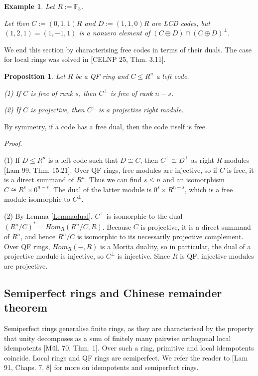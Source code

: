 \documentclass{article}
\theoremstyle{plain}
\newtheorem{Prop}[veta]{Proposition}
\newtheorem{Ex}[veta]{Example}
\theoremstyle{plain}
\theoremstyle{remark}
\theoremstyle{plain}
\newcommand{\F}{\mathbb{F}}
\newenvironment{dukaz}{
  \par\medskip \noindent
  \textit{Proof}.
}{

\rightline{$\qedsymbol$}
}
\begin{document}
\begin{Ex}\label{ExDirSum}
Let $R:=\F_3$.

Let then $C:=(0,1,1)R$ and $D:=(1,1,0)R$ are LCD codes, but $(1,2,1)=(1,-1,1)$ is a nonzero element of $(C\oplus D)\cap (C\oplus D)^\perp$.    
\end{Ex}


We end this section by characterising free codes in terms of their duals. The case for local rings was solved in [CELNP 25, Thm. 3.11].
\begin{Prop} \label{PropFree} Let $R$ be a QF ring and $C\leq R^n$ a left code.

(1) If $C$ is free of rank $s$, then $C^\perp$ is free of rank $n-s$.  

(2) If $C$ is projective, then $C^\perp$ is a projective right module.
\end{Prop}
By symmetry, if a code has a free dual, then the code itself is free.
\begin{dukaz}
(1) If $D\leq R^n$ is a left code such that $D\cong C$, then $C^\perp\cong D^\perp$ as right $R$-modules [Lam 99, Thm. 15.21].  Over QF rings, free modules are injective, so if $C$ is free, it is a direct summand of $R^n$. Thus we can find $s\leq n$ and an isomorphism $C\cong R^s\times 0^{n-s}$. The dual of the latter module is $0^s\times R^{n-s}$, which is a free module isomorphic to $C^\perp$. 

(2) By Lemma \ref{Lemmadual}, $C^\perp$ is isomorphic to the dual $(R^n/C)^*=Hom_R(R^n/C, R)$. Because $C$ is projective, it is a direct summand of $R^n$, and hence $R^n/C$ is isomorphic to its necessarily projective complement. Over QF rings, $Hom_R(-, R)$ is a Morita duality, so in particular, the dual of a projective module is injective, so $C^\perp$ is injective. Since $R$ is QF, injective modules are projective. 
\end{dukaz}

\subsection{Semiperfect rings and Chinese remainder theorem}\label{SecSemiperfect}

Semiperfect rings generalise finite rings, as they are characterised by the property that unity decomposes as a sum of finitely many pairwise orthogonal local idempotents [Mül. 70, Thm. 1].  Over such a ring, primitive and local idempotents coincide. Local rings and QF rings are semiperfect. We refer the reader to [Lam 91, Chaps. 7, 8] for more on idempotents and semiperfect rings.
\end{document}

